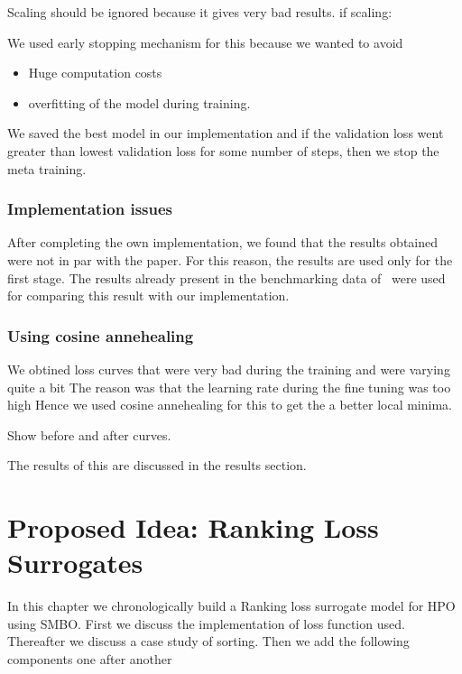 \documentclass[11pt]{report}
\begin{document}
Scaling should be ignored because it gives very bad results.
if scaling:


We used early stopping mechanism for this because we wanted to avoid
\begin{itemize}
\item Huge computation costs
\item overfitting of the model during training.
\end{itemize}
We saved the best model in our implementation and if the validation loss went greater than
lowest validation loss for some number of steps,  then we stop the meta training.



\subsection{Implementation issues}
After completing the own implementation,  we found that the results obtained were not in par with the paper.
For this reason, the results are used only for the first stage.
The results already present in the benchmarking data of~\cite{pineda2021hpob} were used for comparing this result with our implementation.

\subsection{Using cosine annehealing }
We obtined loss curves that were very bad during the training and were varying quite a bit
The reason was that the learning rate during the fine tuning was too high
Hence we used cosine annehealing for this to get the a better local minima.

Show before and after curves.


The results of this are discussed in the results section.




\chapter{Proposed Idea: Ranking Loss Surrogates}

In this chapter we chronologically build a Ranking loss surrogate model for HPO using SMBO.
First we discuss the implementation of loss function used.
Thereafter we discuss a case study of sorting.
Then we add the following components one after another
\end{document}
